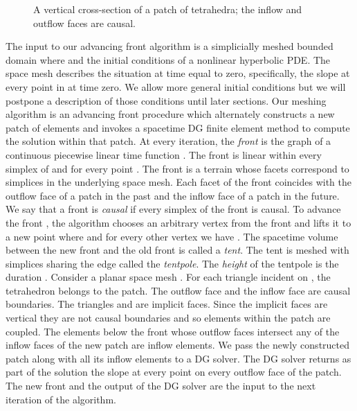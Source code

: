\documentclass[twocolumn]{article}
\def\fig#1{fig/#1}
\newif\iffig
\begin{document}
\begin{figure}\centering\footnotesize\sf
\iffig\texttt{[image: \\fig\{patch]}}\fi
\caption{A vertical cross-section
  of a patch of tetrahedra; the inflow and outflow faces are causal.}
\label{fig:patch}
\end{figure}




The input to our advancing front algorithm is a simplicially meshed
bounded domain  where  and the initial
conditions of a nonlinear hyperbolic PDE.  The space mesh describes
the situation at time equal to zero, specifically, the slope at every
point in  at time zero.  We allow more general initial conditions
but we will postpone a description of those conditions until later
sections.  Our meshing algorithm is an advancing front procedure which
alternately constructs a new patch of elements and invokes a spacetime
DG finite element method to compute the solution within that patch.
At every iteration, the \emph{front} is the graph of a continuous
piecewise linear time function .  The front  is
linear within every simplex of  and  for every point .  The front is a terrain whose
facets correspond to simplices in the underlying space mesh.  Each
facet of the front coincides with the outflow face of a patch in the
past and the inflow face of a patch in the future.  We say that a
front is \emph{causal} if every simplex of the front is causal.  To
advance the front , the algorithm chooses an arbitrary vertex  from the front and lifts it to a new point  where  and for every other vertex  we
have .  The spacetime volume between the new front
 and the old front  is called a \emph{tent}.  The tent is
meshed with simplices sharing the edge  called the
\emph{tentpole}.  The \emph{height} of the tentpole is the duration
.  Consider a planar space mesh .  For each
triangle  incident on , the tetrahedron 
belongs to the patch.  The outflow face  and the inflow
face  are causal boundaries.  The triangles 
and  are implicit faces.  Since the implicit faces are
vertical they are not causal boundaries and so elements within the
patch are coupled.  The elements below the front  whose outflow
faces intersect any of the inflow faces of the new patch are inflow
elements.  We pass the newly constructed patch along with all its
inflow elements to a DG solver.  The DG solver returns as part of the
solution the slope at every point on every outflow face of the patch.
The new front  and the output of the DG solver are the input to
the next iteration of the algorithm.
\end{document}
